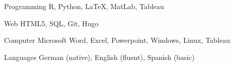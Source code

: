

\begin{cvskills}

  \cvskill
    {Programming} %
    {R, Python, LaTeX, MatLab, Tableau} %

  \cvskill
    {Web} %
    {HTML5, SQL, Git, Hugo} %

  \cvskill
    {Computer} %
    {Microsoft Word, Excel, Powerpoint, Windows, Linux, Tableau} %


  \cvskill
    {Languages} %
    {German (native), English (fluent), Spanish (basic)} %


\end{cvskills}
